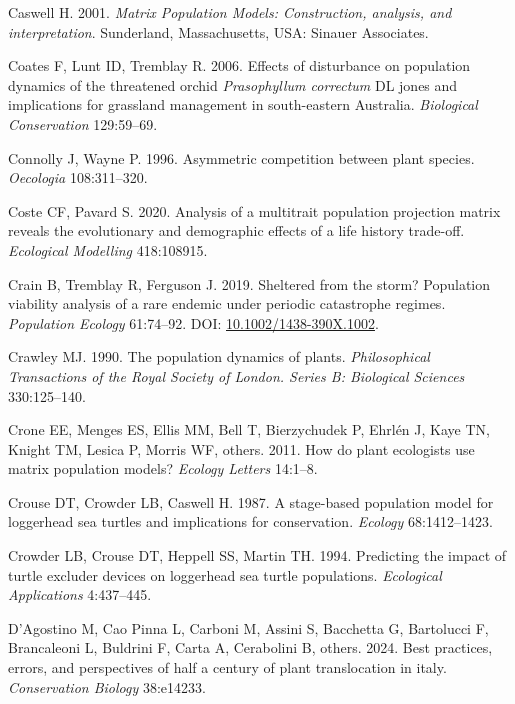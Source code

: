 \documentclass[
  12pt,
  letterpaper,
]{book}
\newlength{\cslhangindent}
\newenvironment{CSLReferences}[2] %
 {\begin{list}{}{%
  \setlength{\itemindent}{0pt}
  \setlength{\leftmargin}{0pt}
  \setlength{\parsep}{0pt}
  \ifodd #1
   \setlength{\leftmargin}{\cslhangindent}
   \setlength{\itemindent}{-1\cslhangindent}
  \fi
  \setlength{\itemsep}{#2\baselineskip}}}
 {\end{list}}
\begin{document}
\begin{CSLReferences}{1}{0}
Caswell H. 2001. \emph{Matrix {P}opulation {M}odels: Construction,
analysis, and interpretation}. Sunderland, Massachusetts, USA: Sinauer
Associates.

Coates F, Lunt ID, Tremblay R. 2006. Effects of disturbance on
population dynamics of the threatened orchid \emph{{P}rasophyllum
{c}orrectum} DL jones and implications for grassland management in
south-eastern {A}ustralia. \emph{Biological Conservation} 129:59--69.

Connolly J, Wayne P. 1996. Asymmetric competition between plant species.
\emph{Oecologia} 108:311--320.

Coste CF, Pavard S. 2020. Analysis of a multitrait population projection
matrix reveals the evolutionary and demographic effects of a life
history trade-off. \emph{Ecological Modelling} 418:108915.

Crain B, Tremblay R, Ferguson J. 2019. Sheltered from the storm?
Population viability analysis of a rare endemic under periodic
catastrophe regimes. \emph{Population Ecology} 61:74--92. DOI:
\href{https://doi.org/10.1002/1438-390X.1002}{10.1002/1438-390X.1002}.

Crawley MJ. 1990. The population dynamics of plants. \emph{Philosophical
Transactions of the Royal Society of London. Series B: Biological
Sciences} 330:125--140.

Crone EE, Menges ES, Ellis MM, Bell T, Bierzychudek P, Ehrlén J, Kaye
TN, Knight TM, Lesica P, Morris WF, others. 2011. How do plant
ecologists use matrix population models? \emph{Ecology Letters} 14:1--8.

Crouse DT, Crowder LB, Caswell H. 1987. A stage-based population model
for loggerhead sea turtles and implications for conservation.
\emph{Ecology} 68:1412--1423.

Crowder LB, Crouse DT, Heppell SS, Martin TH. 1994. Predicting the
impact of turtle excluder devices on loggerhead sea turtle populations.
\emph{Ecological Applications} 4:437--445.

D'Agostino M, Cao Pinna L, Carboni M, Assini S, Bacchetta G, Bartolucci
F, Brancaleoni L, Buldrini F, Carta A, Cerabolini B, others. 2024. Best
practices, errors, and perspectives of half a century of plant
translocation in italy. \emph{Conservation Biology} 38:e14233.


\end{CSLReferences}
\end{document}
